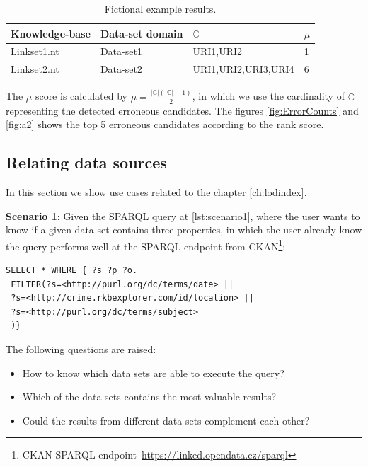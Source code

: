  \begin{table}[H]
 	\centering
 	\caption{Fictional example results.}
 	\label{tab:tuples}
 	\begin{tabular}{@{}llll@{}}
 		\toprule
 		Knowledge-base & Data-set domain & \textbf{$\mathbb{C}$} & $\mu$ \\ \midrule
 		Linkset1.nt                 & Data-set1         & URI1,URI2               & 1              \\
 		Linkset2.nt                 & Data-set2         & {\small URI1,URI2,URI3,URI4}     & 6              \\ \bottomrule
 	\end{tabular}
 \end{table}
%
The $\mu$ score is calculated by $\mu = \frac{|\mathbb{C}|(|\mathbb{C}| - 1)}{2}$, in which we use the cardinality of $\mathbb{C}$ representing the detected erroneous candidates. The figures \ref{fig:ErrorCounts} and \ref{fig:a2} shows the top 5 erroneous candidates according to the rank score.

\subsection{Relating data sources}
In this section we show use cases related to the chapter \ref{ch:lodindex}.

 \textbf{Scenario 1}: Given the SPARQL query at \cref{lst:scenario1}, where the user wants to know if a given data set contains three properties, in which the user already know the query performs well at the SPARQL endpoint from CKAN\footnote{  CKAN SPARQL endpoint~\url{https://linked.opendata.cz/sparql}}:

 \begin{lstlisting}[language=SPARQL, label={lst:scenario1}, caption=Scenario 1.]
 SELECT * WHERE { ?s ?p ?o.
 FILTER(?s=<http://purl.org/dc/terms/date> || 
 ?s=<http://crime.rkbexplorer.com/id/location> || 
 ?s=<http://purl.org/dc/terms/subject>
 )}
 \end{lstlisting}
 The following questions are raised:
 \begin{itemize}
     \item How to know which data sets are able to execute the query?
     \item Which of the data sets contains the most valuable results?
     \item Could the results from different data sets complement each other?
 \end{itemize}

